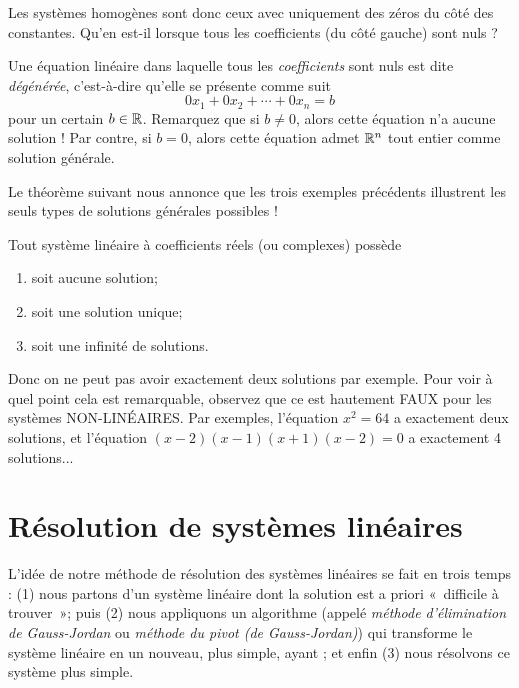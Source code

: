 
Les systèmes homogènes sont donc ceux avec uniquement des zéros du c\^ot\'e des constantes. Qu'en est-il lorsque tous les coefficients (du c\^ot\'e gauche) sont nuls ?

\begin{definition}
Une équation linéaire dans laquelle tous les \emph{coefficients} sont nuls est dite
\emph{dégénérée}, c'est-à-dire qu'elle se présente comme suit
$$
0x_1 + 0x_2 + \cdots + 0x_n = b
$$
pour un certain $b\in \mathbb{R}$.  Remarquez que si $b\neq 0$, alors cette équation n'a aucune solution !  Par contre, si $b=0$, alors cette équation admet $\mathbb{R}^n$ tout entier comme  solution générale.
\end{definition}


Le théorème suivant nous annonce que les trois exemples précédents illustrent les seuls types de solutions générales possibles !


\begin{theorem}
Tout système linéaire à coefficients réels (ou complexes) possède
\begin{enumerate}
\item soit aucune solution;
\item soit une solution unique;
\item soit une infinit\'e de solutions.
\end{enumerate}
\end{theorem}

Donc on ne peut pas avoir exactement deux solutions par exemple. Pour voir à quel point cela est remarquable, observez que ce est hautement FAUX pour les systèmes NON-LIN\'EAIRES. Par exemples, l'\'equation 
$x^2=64$ a exactement deux solutions, et l'équation $(x-2)(x-1)(x+1)(x-2)=0$ a exactement 4 solutions...


\section{Résolution de systèmes linéaires}

L'idée de notre méthode de résolution des systèmes linéaires se fait en trois temps : (1) nous partons d'un
 système linéaire dont la solution est a priori «~difficile à trouver~»; puis (2) nous appliquons
un algorithme (appelé \emph{m\'ethode d'élimination de Gauss-Jordan} ou \emph{méthode du pivot (de Gauss-Jordan)})
qui transforme le système linéaire en un nouveau, plus simple, ayant ; et enfin (3) nous résolvons ce  système plus simple.

